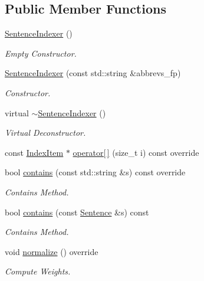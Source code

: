 \subsection*{Public Member Functions}
\begin{DoxyCompactItemize}
\item 
\hyperlink{class_sentence_indexer_a2ec9f359954191ebc5d84c759fd2238d}{Sentence\+Indexer} ()
\begin{DoxyCompactList}\small\item\em Empty Constructor. \end{DoxyCompactList}\item 
\hyperlink{class_sentence_indexer_a65a376d016bd9ff8a9f7c1f8521f2a1f}{Sentence\+Indexer} (const std\+::string \&abbrevs\+\_\+fp)
\begin{DoxyCompactList}\small\item\em Constructor. \end{DoxyCompactList}\item 
\mbox{\label{class_sentence_indexer_a8048abf41bf3513d04c611e90afddcc5}} 
virtual \hyperlink{class_sentence_indexer_a8048abf41bf3513d04c611e90afddcc5}{$\sim$\+Sentence\+Indexer} ()
\begin{DoxyCompactList}\small\item\em Virtual Deconstructor. \end{DoxyCompactList}\item 
const \hyperlink{class_index_item}{Index\+Item} $\ast$ \hyperlink{class_sentence_indexer_adcc5897caef051a20a2ef6e767989d88}{operator\mbox{[}$\,$\mbox{]}} (size\+\_\+t i) const override
\item 
bool \hyperlink{class_sentence_indexer_af3299500d89ff36586472f81eb8efae8}{contains} (const std\+::string \&s) const override
\begin{DoxyCompactList}\small\item\em Contains Method. \end{DoxyCompactList}\item 
bool \hyperlink{class_sentence_indexer_aa4af4b0d8b859bd6ff4eed4889c8447c}{contains} (const \hyperlink{class_sentence}{Sentence} \&s) const
\begin{DoxyCompactList}\small\item\em Contains Method. \end{DoxyCompactList}\item 
void \hyperlink{class_sentence_indexer_ae038d36081439a5107821ac48a318d66}{normalize} () override
\begin{DoxyCompactList}\small\item\em Compute Weights. \end{DoxyCompactList}\item 

\end{DoxyCompactItemize}
